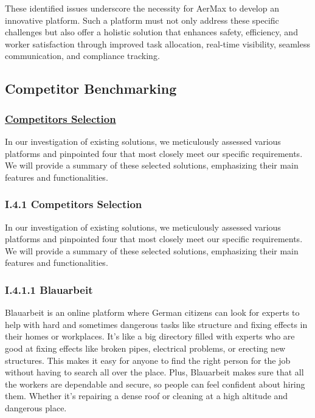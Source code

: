 These identified issues underscore the necessity for AerMax to develop an innovative platform. Such a platform must not only address these specific challenges but also offer a holistic solution that enhances safety, efficiency, and worker satisfaction through improved task allocation, real-time visibility, seamless communication, and compliance tracking.

 

\subsection{Competitor Benchmarking}
\subsubsection*{\underline{Competitors Selection}}
In our investigation of existing solutions, we meticulously assessed various platforms and pinpointed four that most closely meet our specific requirements. We will provide a summary of these selected solutions, emphasizing their main features and functionalities.

\subsubsection*{I.4.1 Competitors Selection}
In our investigation of existing solutions, we meticulously assessed various platforms and pinpointed four that most closely meet our specific requirements. We will provide a summary of these selected solutions, emphasizing their main features and functionalities.

\subsubsection*{I.4.1.1 Blauarbeit}
 
Blauarbeit is an online platform where German citizens can look for experts to help with hard and sometimes dangerous tasks like structure and fixing effects in their homes or workplaces. It's like a big directory filled with experts who are good at fixing effects like broken pipes, electrical problems, or erecting new structures. This makes it easy for anyone to find the right person for the job without having to search all over the place. Plus, Blauarbeit makes sure that all the workers are dependable and secure, so people can feel confident about hiring them. Whether it's repairing a dense roof or cleaning at a high altitude and dangerous place.

